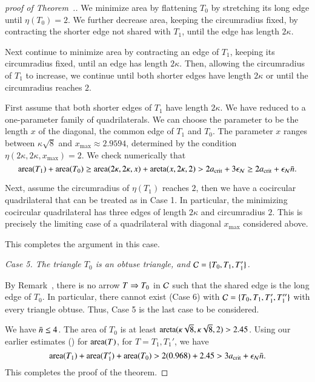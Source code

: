 \begin{proof}[proof of Theorem~.]
We minimize area by flattening $T_0$ by stretching its long edge until
$\eta(T_0)=2$.  We further decrease area, keeping the circumradius
fixed, by contracting the shorter edge not shared with $T_1$, until
the edge has length $2\kappa$.

Next continue to minimize area by contracting an edge of $T_1$,
keeping its circumradius fixed, until an edge has length $2\kappa$.
Then, allowing the circumradius of $T_1$ to increase, we continue until
both shorter edges have length $2\kappa$ or until the circumradius
reaches $2$.

First assume that both shorter edges of $T_1$ have length $2\kappa$.
We have reduced to a one-parameter family of quadrilaterals.  We can
choose the parameter to be the length $x$ of the diagonal, the common
edge of $T_1$ and $T_0$.  The parameter $x$ ranges between
$\kappa\sqrt{8}$ and $x_{\max}\approx 2.9594$, determined by the
condition $\eta(2\kappa,2\kappa,x_{\max}) = 2$.  We check numerically
that
\[
{\operatorname{area}}(T_1) + {\operatorname{area}}(T_0) \ge {\operatorname{area}}(2\kappa,2\kappa,x) +
{\operatorname{areta}}(x,2\kappa,2) > 2a_\text{crit} + 3 \epsilon_{\mathcal N} \ge 2a_\text{crit} + \epsilon_{\mathcal N} \bar n.
\] %

Next, assume the circumradius of $\eta(T_1)$ reaches $2$, then we
have a cocircular quadrilateral that can be treated as in Case 1.  In
particular, the minimizing cocircular quadrilateral has three edges of
length $2\kappa$ and circumradius $2$.  This is precisely the limiting
case of a quadrilateral with diagonal $x_{\max}$ considered above.

This completes the argument in this case.

{\it Case 5. The triangle $T_0$ is an obtuse triangle, and $\mathcal C=\{T_0,T_1,T_1'\}$.}  

By Remark~, there is no arrow $T \Rightarrow T_0$ in $\mathcal C$
such that the shared edge is the long edge of $T_0$.  In particular,
there cannot exist (Case 6) with $\mathcal C=\{T_0,T_1,T_1',T_1''\}$ with
every triangle obtuse.  Thus, Case 5 is the last case to be
considered.

We have $\bar n\le 4$.
The area of $T_0$ is at least
${\operatorname{areta}}(\kappa\sqrt{8},\kappa\sqrt{8},2) > 2.45$.  
Using our earlier estimates ()
for ${\operatorname{area}}(T)$, for $T=T_1,T_1'$, we
have
\[
{\operatorname{area}}(T_1) + {\operatorname{area}}(T_1') + {\operatorname{area}}(T_0) > 2 (0.968) + 2.45 > 3a_\text{crit} + \epsilon_{\mathcal N}\bar n.
\] %
This completes the proof of the theorem.
\end{proof}



